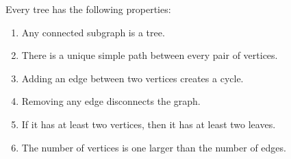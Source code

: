 \begin{theorem}\label{th:treeprops}
Every tree has the following properties:

\begin{enumerate}
\item Any connected subgraph is a tree.\label{asub}

\item There is a unique simple path between every pair of vertices.
\item Adding an edge between two vertices creates a cycle.
\item Removing any edge disconnects the graph.
\item If it has at least two vertices, then it has at least two leaves.
\item The number of vertices is one larger than the number of edges.
\end{enumerate}
\end{theorem}

